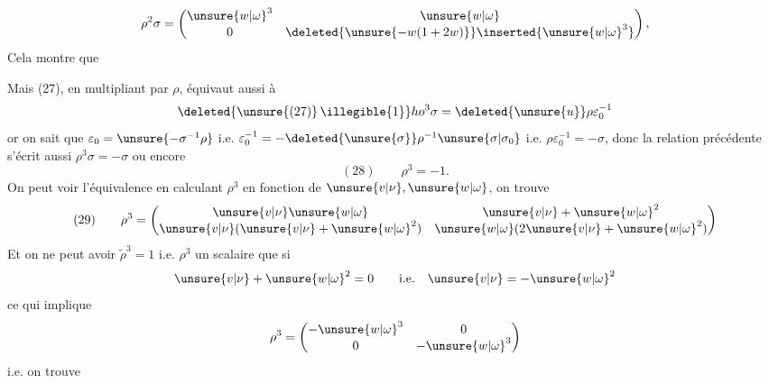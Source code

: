 

\[
\rho^2\sigma=\begin{pmatrix}\unsure{w|\omega}^3&\unsure{w|\omega}\\0&\deleted{\unsure{-w(1+2w)}}\inserted{\unsure{w|\omega}^3}\end{pmatrix},
\]
Cela montre que
\inserted{
\[
(27\mathrm{bis})\qquad
\rho^2\sigma=\varepsilon_0^{-1}\Longleftrightarrow
\left\{\unsure{v|\nu}+\unsure{w|\omega}^2=0,\ \unsure{w|\omega}^3=1\right.
\quad
\left(\Rightarrow \unsure{v|\nu}=-\unsure{w|\omega}^2=-1/\unsure{w|\omega}\ \text{i.e.}\ \unsure{w|\omega}=-1/\unsure{v|\nu},\ \mathrm{OK}\right)
\]
}

Mais (27), en multipliant par $\rho$, équivaut aussi à
\[\deleted{\unsure{(27)}\,\illegible{1}}ho^3\sigma=\deleted{\unsure{u}}\rho\varepsilon_0^{-1}
\]
or on sait que $\varepsilon_0=\unsure{-\sigma^{-1}\rho}$  i.e. $\varepsilon_0^{-1}=-\deleted{\unsure{\sigma}}\rho^{-1}\unsure{\sigma|\sigma_0}$
i.e. $\rho\varepsilon_0^{-1}=-\sigma$, donc la relation précédente s'écrit aussi $\rho^3\sigma=-\sigma$ ou encore
\[
(28)\qquad \boxed{\rho^3=-1}.
\]
On peut voir  l'équivalence  en calculant $\rho^3$ en fonction de $\unsure{v|\nu},\unsure{w|\omega}$, on trouve
\[
(29)\qquad
\rho^3=\begin{pmatrix}\unsure{v|\nu}\unsure{w|\omega}&\unsure{v|\nu}+\unsure{w|\omega}^2\\\unsure{v|\nu}(\unsure{v|\nu}+\unsure{w|\omega}^2)&\unsure{w|\omega}(2\unsure{v|\nu}+\unsure{w|\omega}^2)\end{pmatrix}
\]
Et on ne peut avoir $\widetilde\rho^3=1$ i.e. $\rho^3$ un scalaire que si 
\[
\unsure{v|\nu}+\unsure{w|\omega}^2=0\qquad\text{i.e.}\quad \unsure{v|\nu}=-\unsure{w|\omega}^2
\]
ce qui implique
\[
\rho^3=\begin{pmatrix}-\unsure{w|\omega}^3&0\\0&-\unsure{w|\omega}^3\end{pmatrix}
\]
i.e. on trouve

